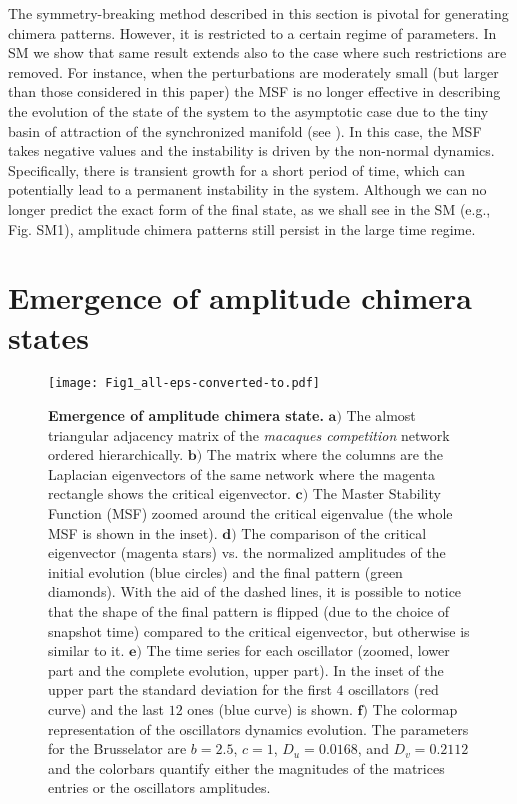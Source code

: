\documentclass[prx,twocolumn,amsmath,noshowkeys,noshowpacs,amssymb]{revtex4-2}
\begin{document}
{The symmetry-breaking method described in this section is pivotal for generating chimera patterns. However, it is restricted to a certain regime of parameters. In SM we show that same result extends also to the case where such restrictions are removed. For instance, when the perturbations are moderately small (but larger than those considered in this paper) the MSF is no longer effective in describing the evolution of the state of the system to the asymptotic case due to the tiny basin of attraction of the synchronized manifold (see \cite{Asllani2018PRE, Muolo2019, Muolo2021}). In this case, the MSF takes negative values and the instability is driven by the non-normal dynamics. Specifically, there is transient growth for a short period of time, which can potentially lead to a permanent instability in the system. Although we can no longer predict the exact form of the final state, as we shall see in the SM (e.g., Fig. SM1), amplitude chimera patterns still persist in the large time regime.}



\section{Emergence of amplitude chimera states}
\label{sec:II}
\noindent

\begin{figure*}
	\centering
	\texttt{[image: Fig1\_all-eps-converted-to.pdf]}
	\caption{\textbf{Emergence of amplitude chimera state.} $\textbf{a)}$ The almost triangular adjacency matrix of the \textit{macaques competition} network \cite{ref41} ordered hierarchically. $\textbf{b)}$ The matrix where the columns are the Laplacian eigenvectors of the same network where the magenta rectangle shows the critical eigenvector. $\textbf{c)}$ The Master Stability Function (MSF) zoomed around the critical eigenvalue (the whole MSF is shown in the inset). $\textbf{d)}$ The comparison of the critical eigenvector (magenta stars) vs. the normalized amplitudes of the initial evolution (blue circles) and the final pattern (green diamonds). {With the aid of the dashed lines, it is possible to notice} that the shape of the final pattern is flipped (due to the choice of snapshot time) compared to the critical eigenvector, but otherwise is similar to it. $\textbf{e)}$ The time series for each oscillator (zoomed, lower part and the complete evolution, upper part). In the inset of the upper part the standard deviation for the first $4$ oscillators (red curve) and the last $12$ ones (blue curve) is shown. $\textbf{f)}$ The colormap representation of the oscillators dynamics evolution. The parameters for the Brusselator are $b=2.5$, $c=1$, $D_u=0.0168$, and $D_v=0.2112$ and the colorbars quantify either the magnitudes of the matrices entries or the oscillators amplitudes.}
	\label{Fig1}
\end{figure*}
\end{document}
